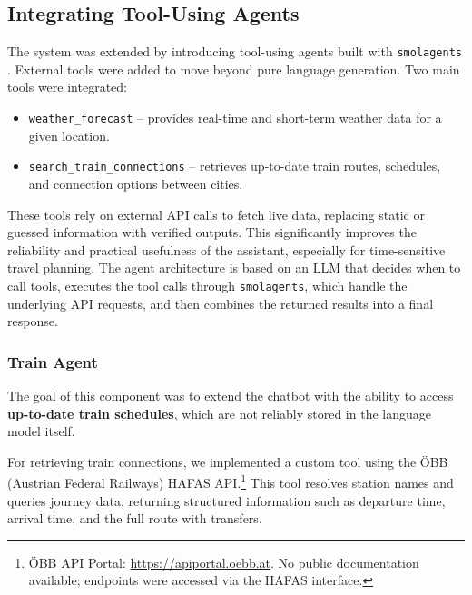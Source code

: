 \documentclass[fleqn,moreauthors,10pt]{ds_report}
\begin{document}
\subsection*{Integrating Tool-Using Agents}

The system was extended by introducing tool-using agents built with \texttt{smolagents} \cite{smolagents}. External tools were added to move beyond pure language generation. Two main tools were integrated:
\begin{itemize}
    \item \texttt{weather\_forecast} -- provides real-time and short-term weather data for a given location.
    \item \texttt{search\_train\_connections} -- retrieves up-to-date train routes, schedules, and connection options between cities.
\end{itemize} 


These tools rely on external API calls to fetch live data, replacing static or guessed information with verified outputs. This significantly improves the reliability and practical usefulness of the assistant, especially for time-sensitive travel planning. The agent architecture is based on an LLM that decides when to call tools, executes the tool calls through \texttt{smolagents}, which handle the underlying API requests, and then combines the returned results into a final response.



\subsubsection*{Train Agent}

The goal of this component was to extend the chatbot with the ability to access \textbf{up-to-date train schedules}, which are not reliably stored in the language model itself.

For retrieving train connections, we implemented a custom tool using the ÖBB (Austrian Federal Railways) HAFAS API.\footnote{ÖBB API Portal: \url{https://apiportal.oebb.at}. No public documentation available; endpoints were accessed via the HAFAS interface.} This tool resolves station names and queries journey data, returning structured information such as departure time, arrival time, and the full route with transfers.

\end{document}
